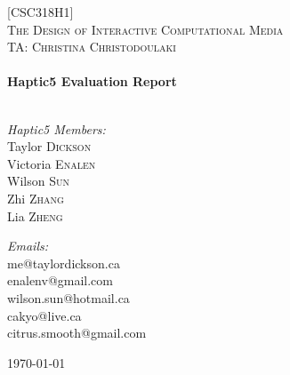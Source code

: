 
\begin{titlepage}
\begin{center}

\textsc{\LARGE [CSC318H1]}\\[0.5cm]
\textsc{The Design of Interactive Computational Media}\\[1cm]

\textsc{\Large TA: Christina Christodoulaki}\\[0.5cm]

\HRule \\[0.4cm]
{ \huge \bfseries Haptic5 Evaluation Report}\\[0.4cm]

\HRule \\[1.5cm]

\begin{minipage}{0.4\textwidth}
\begin{flushleft} \large
\emph{Haptic5 Members:}\\
Taylor\textsc{ Dickson}\\
Victoria\textsc{ Enalen}\\
Wilson\textsc{ Sun}\\
Zhi\textsc{ Zhang}\\
Lia\textsc{ Zheng}\\
\end{flushleft}
\end{minipage}
\begin{minipage}{0.4\textwidth}
\begin{flushright} \large
\emph{Emails:} \\
 me@taylordickson.ca\\
 enalenv@gmail.com \\
 wilson.sun@hotmail.ca\\
 cakyo@live.ca‎\\
 citrus.smooth@gmail.com\\
 
\end{flushright}
\end{minipage}

\vfill

{\large \today}

\end{center}
\end{titlepage}